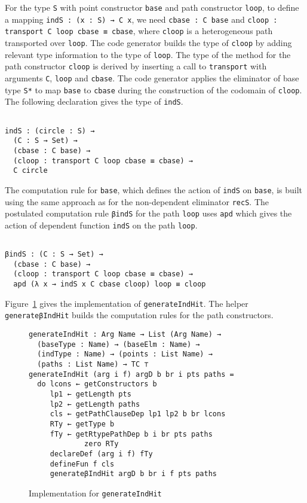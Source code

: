 \documentclass[sigplan,10pt]{acmart}
\begin{document}
For the type {\tt S} with point constructor {\tt base} and path constructor {\tt loop}, to define a mapping {\tt indS : (x : S) → C x}, we need {\tt cbase : C base} and {\tt cloop : transport C loop cbase ≡ cbase}, where {\tt cloop} is a heterogeneous path transported over {\tt loop}. The code generator builds the type of {\tt cloop} by adding relevant type information to the type of {\tt loop}.
The type of the method for the path constructor {\tt cloop} is derived by inserting a call to {\tt transport} with arguments {\tt C}, {\tt loop} and {\tt cbase}. %
The code generator applies the eliminator of base type {\tt S*} to map {\tt base} to {\tt cbase} during the construction of the codomain of {\tt cloop}. The following declaration gives the type of {\tt indS}.
\begin{center}
\begin{BVerbatim}

indS : (circle : S) → 
  (C : S → Set) →
  (cbase : C base) →
  (cloop : transport C loop cbase ≡ cbase) →
  C circle

\end{BVerbatim}
\end{center}

The computation rule for {\tt base}, which defines the action of {\tt indS} on {\tt base}, is built using the same approach as for the non-dependent eliminator {\tt recS}.
The postulated computation rule {\tt βindS} for the path {\tt loop} uses {\tt apd} which gives the action of dependent function {\tt indS} on the path {\tt loop}.
\begin{center}
\begin{BVerbatim}

βindS : (C : S → Set) → 
  (cbase : C base) → 
  (cloop : transport C loop cbase ≡ cbase) → 
  apd (λ x → indS x C cbase cloop) loop ≡ cloop

\end{BVerbatim}
\end{center}

Figure~\ref{fig:generateIndHit} gives the implementation of {\tt generateIndHit}. The helper {\tt generateβIndHit} builds the computation rules for the path constructors.

\begin{figure}
\begin{center}
\begin{Verbatim}
generateIndHit : Arg Name → List (Arg Name) →
  (baseType : Name) → (baseElm : Name) → 
  (indType : Name) → (points : List Name) → 
  (paths : List Name) → TC ⊤
generateIndHit (arg i f) argD b br i pts paths =
  do lcons ← getConstructors b
     lp1 ← getLength pts
     lp2 ← getLength paths
     cls ← getPathClauseDep lp1 lp2 b br lcons
     RTy ← getType b
     fTy ← getRtypePathDep b i br pts paths
             zero RTy
     declareDef (arg i f) fTy
     defineFun f cls
     generateβIndHit argD b br i f pts paths
\end{Verbatim}
\end{center}
\caption{Implementation for {\tt generateIndHit}}
\label{fig:generateIndHit}
\end{figure}
\normalsize
\end{document}
